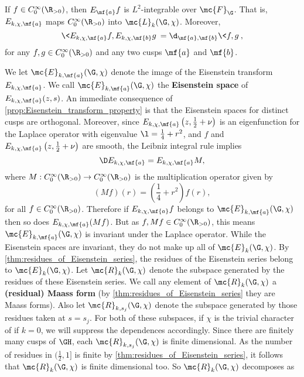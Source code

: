     \begin{proposition}\label{prop:Eisenstein_transform_property}
      If $f \in C_{0}^{\infty}(\R_{> 0})$, then $E_{\mf{a}}f$ is $L^{2}$-integrable over $\mc{F}_{\G}$. That is, $E_{k,\chi,\mf{a}}$ maps $C_{0}^{\infty}(\R_{> 0})$ into $\mc{L}_{k}(\G,\chi)$. Moreover,
      \[
        \<E_{k,\chi,\mf{a}}f,E_{k,\chi,\mf{b}}g\> = \d_{\mf{a},\mf{b}}\<f,g\>,
      \]
      for any $f,g \in C_{0}^{\infty}(\R_{> 0})$ and any two cusps $\mf{a}$ and $\mf{b}$.
    \end{proposition}

    We let $\mc{E}_{k,\mf{a}}(\G,\chi)$ denote the image of the Eisenstein transform $E_{k,\chi,\mf{a}}$. We call $\mc{E}_{k,\mf{a}}(\G,\chi)$ the \textbf{Eisenstein space} of $E_{k,\chi,\mf{a}}(z,s)$. An immediate consequence of \cref{prop:Eisenstein_transform_property} is that the Eisenstein spaces for distinct cusps are orthogonal. Moreover, since $E_{k,\chi,\mf{a}}\left(z,\frac{1}{2}+\nu\right)$ is an eigenfunction for the Laplace operator with eigenvalue $\l = \frac{1}{4}+r^{2}$, and $f$ and $E_{k,\chi,\mf{a}}\left(z,\frac{1}{2}+\nu\right)$ are smooth, the Leibniz integral rule implies
    \[
      \D E_{k,\chi,\mf{a}}= E_{k,\chi,\mf{a}}M,
    \]
    where $M:C_{0}^{\infty}(\R_{> 0}) \to C_{0}^{\infty}(\R_{> 0})$ is the multiplication operator given by
    \[
      (Mf)(r) = \left(\frac{1}{4}+r^{2}\right)f(r),
    \]
    for all $f \in C_{0}^{\infty}(\R_{> 0})$. Therefore if $E_{k,\chi,\mf{a}}f$ belongs to $\mc{E}_{k,\mf{a}}(\G,\chi)$ then so does $E_{k,\chi,\mf{a}}(Mf)$. But as $f,Mf \in C_{0}^{\infty}(\R_{> 0})$, this means $\mc{E}_{k,\mf{a}}(\G,\chi)$ is invariant under the Laplace operator. While the Eisenstein spaces are invariant, they do not make up all of $\mc{E}_{k}(\G,\chi)$. By \cref{thm:residues_of_Eisenstein_series}, the residues of the Eisenstein series belong to $\mc{E}_{k}(\G,\chi)$. Let $\mc{R}_{k}(\G,\chi)$ denote the subspace generated by the residues of these Eisenstein series. We call any element of $\mc{R}_{k}(\G,\chi)$ a \textbf{(residual) Maass form} (by \cref{thm:residues_of_Eisenstein_series} they are Maass forms). Also let $\mc{R}_{k,s_{j}}(\G,\chi)$ denote the subspace generated by those residues taken at $s = s_{j}$. For both of these subspaces, if $\chi$ is the trivial character of if $k = 0$, we will suppress the dependences accordingly. Since there are finitely many cusps of $\GH$, each $\mc{R}_{k,s_{j}}(\G,\chi)$ is finite dimensional. As the number of residues in $(\frac{1}{2},1]$ is finite by \cref{thm:residues_of_Eisenstein_series}, it follows that $\mc{R}_{k}(\G,\chi)$ is finite dimensional too. So $\mc{R}_{k}(\G,\chi)$ decomposes as
